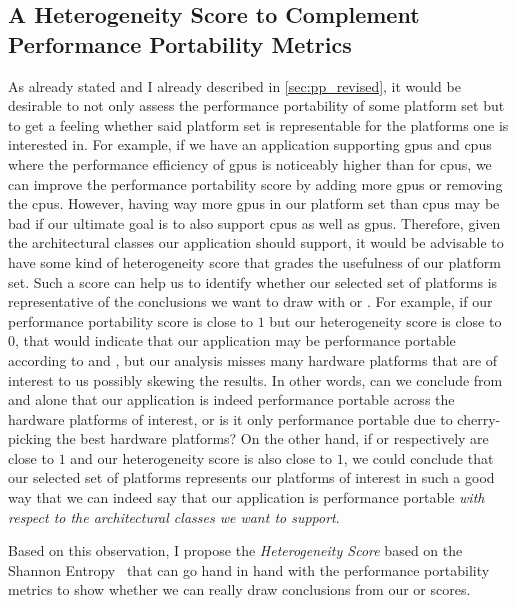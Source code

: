 \subsection{A Heterogeneity Score to Complement Performance Portability Metrics}
\label{sec:heterogeneity_score}

As \citet{yokota_beginners_2018} already stated and I already described in \autoref{sec:pp_revised}, it would be desirable to not only assess the performance portability of some platform set but to get a feeling whether said platform set is representable for the platforms one is interested in. 
For example, if we have an application supporting \glspl{gpu} and \glspl{cpu} where the performance efficiency of \glspl{gpu} is noticeably higher than for \glspl{cpu}, we can improve the performance portability score by adding more \glspl{gpu} or removing the \glspl{cpu}. 
However, having way more \glspl{gpu} in our platform set than \glspl{cpu} may be bad if our ultimate goal is to also support \glspl{cpu} as well as \glspl{gpu}. 
Therefore, given the architectural classes our application should support, it would be advisable to have some kind of heterogeneity score that grades the usefulness of our platform set. 
Such a score can help us to identify whether our selected set of platforms is representative of the conclusions we want to draw with \pp or \mpp. 
For example, if our performance portability score is close to $1$ but our heterogeneity score is close to $0$, that would indicate that our application may be performance portable according to \pp and \mpp, but our analysis misses many hardware platforms that are of interest to us possibly skewing the results. 
In other words, can we conclude from \pp and \mpp alone that our application is indeed performance portable across the hardware platforms of interest, or is it only performance portable due to cherry-picking the best hardware platforms? 
On the other hand, if \pp or \mpp respectively are close to $1$ and our heterogeneity score is also close to $1$, we could conclude that our selected set of platforms represents our platforms of interest in such a good way that we can indeed say that our application is performance portable \textit{with respect to the architectural classes we want to support}.

Based on this observation, I propose the \textit{Heterogeneity Score} based on the Shannon Entropy~\cite{shannon_mathematical_1948} that can go hand in hand with the performance portability metrics to show whether we can really draw conclusions from our \pp or \mpp scores. 

